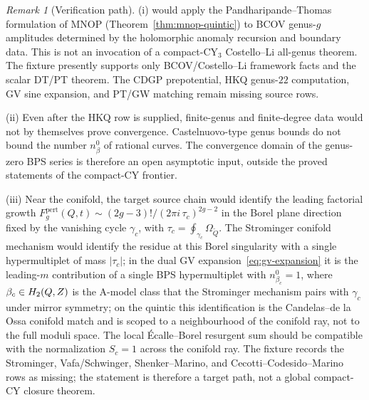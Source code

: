 \documentclass[12pt]{amsart}
\theoremstyle{remark}
\newtheorem{rmk}[thm]{Remark}
\begin{document}
\begin{rmk}[Verification path]
  (i) would apply the Pandharipande--Thomas formulation of MNOP
  (Theorem~\ref{thm:mnop-quintic}) to BCOV genus-$g$ amplitudes
  determined by the holomorphic anomaly recursion and boundary data.
  This is not an invocation of a compact-CY$_3$ Costello--Li all-genus
  theorem. The fixture presently supports only BCOV/Costello--Li
  framework facts and the scalar DT/PT theorem. The CDGP prepotential,
  HKQ genus-\(22\) computation, GV sine expansion, and PT/GW matching
  remain missing source rows.

  (ii) Even after the HKQ row is supplied, finite-genus and finite-degree
  data would not by themselves prove convergence. Castelnuovo-type genus
  bounds do not bound the number \(n_\beta^0\) of rational curves.  The
  convergence domain of the genus-zero BPS series is therefore an open
  asymptotic input, outside the proved statements of the compact-CY
  frontier.

  (iii) Near the conifold, the target source chain would identify the
  leading factorial growth
  $F_g^{\mathrm{pert}}(Q, t) \sim (2g - 3)! / (2\pi i\, \tau_c)^{2g - 2}$
  in the Borel plane direction fixed by the vanishing cycle $\gamma_c$,
  with $\tau_c = \oint_{\gamma_c} \Omega_{\widetilde Q}$. The Strominger
  conifold mechanism would identify the residue at this Borel
  singularity with a single hypermultiplet of mass $|\tau_c|$; in the
  dual GV expansion~\eqref{eq:gv-expansion} it is the leading-$m$
  contribution of a single BPS hypermultiplet with
  $n_{\beta_c}^0 = 1$, where $\beta_c \in H_2(Q, Z)$ is the A-model
  class that the Strominger mechanism pairs with $\gamma_c$ under
  mirror symmetry; on the quintic this identification is the
  Candelas--de la Ossa conifold match and is scoped to a neighbourhood
  of the conifold ray, not to the full moduli space. The
  local \'Ecalle--Borel resurgent sum should be compatible with the
  normalization \(S_c=1\) across the conifold ray. The fixture records the
  Strominger, Vafa/Schwinger, Shenker--Marino, and
  Cecotti--Codesido--Marino rows as missing; the statement is therefore a
  target path, not a global compact-CY closure theorem.
\end{rmk}
\end{document}

